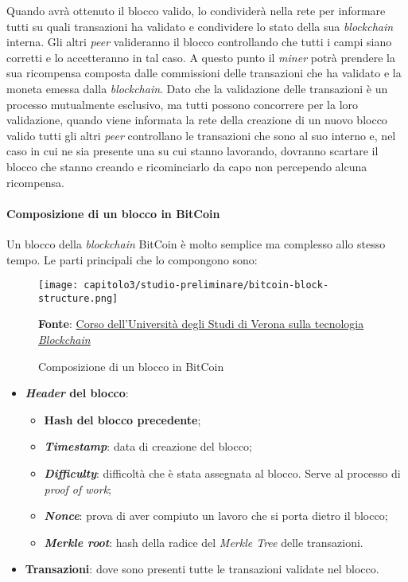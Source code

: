 Quando avrà ottenuto il blocco valido, lo condividerà nella rete per informare tutti su quali transazioni ha validato e condividere lo stato della sua \textit{blockchain} interna. Gli altri \textit{peer} valideranno il blocco controllando che tutti i campi siano corretti e lo accetteranno in tal caso. A questo punto il \textit{miner} potrà prendere la sua ricompensa composta dalle commissioni delle transazioni che ha validato e la moneta emessa dalla \textit{blockchain}. Dato che la validazione delle transazioni è un processo mutualmente esclusivo, ma tutti possono concorrere per la loro validazione, quando viene informata la rete della creazione di un nuovo blocco valido tutti gli altri \textit{peer} controllano le transazioni che sono al suo interno e, nel caso in cui ne sia presente una su cui stanno lavorando, dovranno scartare il blocco che stanno creando e ricominciarlo da capo non percependo alcuna ricompensa.

\paragraph{Composizione di un blocco in BitCoin}

Un blocco della \textit{blockchain} BitCoin è molto semplice ma complesso allo stesso tempo. Le parti principali che lo compongono sono:

\begin{figure}[h!]
  \centering
  \texttt{[image: capitolo3/studio-preliminare/bitcoin-block-structure.png]}
  \caption{Composizione di un blocco in BitCoin}
  \textbf{Fonte}: \href{https://github.com/spoto/blockchain-course}{Corso dell'Università degli Studi di Verona sulla tecnologia \textit{Blockchain}}
\end{figure}

\begin{itemize}
  \item \textbf{\textit{Header} del blocco}:
  \begin{itemize}
    \item \textbf{Hash del blocco precedente};
    \item \textbf{\textit{Timestamp}}: data di creazione del blocco;
    \item \textbf{\textit{Difficulty}}: difficoltà che è stata assegnata al blocco. Serve al processo di \textit{proof of work};
    \item \textbf{\textit{Nonce}}: prova di aver compiuto un lavoro che si porta dietro il blocco;
    \item \textbf{\textit{Merkle root}}: hash della radice del \textit{Merkle Tree} delle transazioni.
  \end{itemize}
  
  \item \textbf{Transazioni}: dove sono presenti tutte le transazioni validate nel blocco.
\end{itemize}

